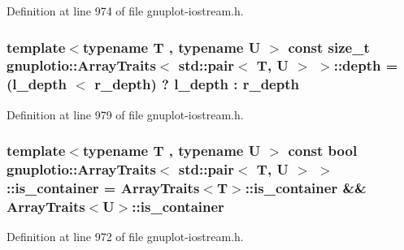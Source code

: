 Definition at line 974 of file gnuplot-\/iostream.\+h.

\subsubsection[{\texorpdfstring{depth}{depth}}]{\setlength{\rightskip}{0pt plus 5cm}template$<$typename T , typename U $>$ const size\+\_\+t {\bf gnuplotio\+::\+Array\+Traits}$<$ std\+::pair$<$ T, U $>$ $>$\+::depth = ({\bf l\+\_\+depth} $<$ {\bf r\+\_\+depth}) ? {\bf l\+\_\+depth} \+: {\bf r\+\_\+depth}\hspace{0.3cm}{\ttfamily [static]}}\hypertarget{classgnuplotio_1_1_array_traits_3_01std_1_1pair_3_01_t_00_01_u_01_4_01_4_a11b3be89ac9506fcfcceb318acc7e2bf}{}\label{classgnuplotio_1_1_array_traits_3_01std_1_1pair_3_01_t_00_01_u_01_4_01_4_a11b3be89ac9506fcfcceb318acc7e2bf}


Definition at line 979 of file gnuplot-\/iostream.\+h.

\subsubsection[{\texorpdfstring{is\+\_\+container}{is_container}}]{\setlength{\rightskip}{0pt plus 5cm}template$<$typename T , typename U $>$ const bool {\bf gnuplotio\+::\+Array\+Traits}$<$ std\+::pair$<$ T, U $>$ $>$\+::is\+\_\+container = {\bf Array\+Traits}$<$T$>$\+::is\+\_\+container \&\& {\bf Array\+Traits}$<$U$>$\+::is\+\_\+container\hspace{0.3cm}{\ttfamily [static]}}\hypertarget{classgnuplotio_1_1_array_traits_3_01std_1_1pair_3_01_t_00_01_u_01_4_01_4_a8656ab8094037d88b470f718ff7197e0}{}\label{classgnuplotio_1_1_array_traits_3_01std_1_1pair_3_01_t_00_01_u_01_4_01_4_a8656ab8094037d88b470f718ff7197e0}


Definition at line 972 of file gnuplot-\/iostream.\+h.

